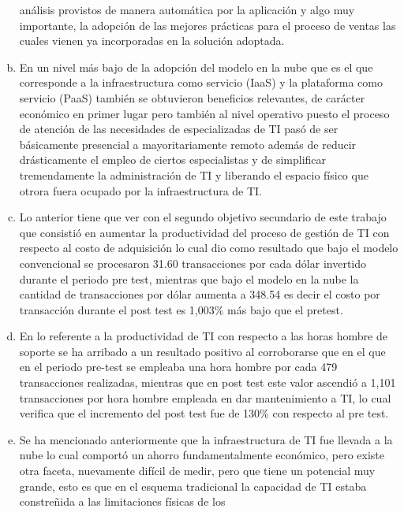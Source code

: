 \begin{enumerate}[a.]
          análisis provistos de manera automática por la aplicación y algo
          muy importante, la adopción de las mejores prácticas para el proceso
          de ventas las cuales vienen ya incorporadas en la solución adoptada.
    \item En un nivel más bajo de la adopción del modelo en la nube que es
          el que corresponde a la infraestructura como servicio (IaaS) y la
          plataforma como servicio (PaaS) también se obtuvieron beneficios
          relevantes, de carácter económico en primer lugar pero también
          al nivel operativo puesto el proceso de atención de las necesidades
          de especializadas de TI pasó de ser básicamente presencial a
          mayoritariamente remoto además de reducir drásticamente el empleo
          de ciertos especialistas y de simplificar tremendamente la administración
          de TI y liberando el espacio físico que otrora fuera ocupado por la
          infraestructura de TI.
    \item Lo anterior tiene que ver con el segundo objetivo secundario de este
          trabajo que consistió en aumentar la productividad del proceso de
          gestión de TI con respecto al costo de adquisición lo cual dio como
          resultado que bajo el modelo convencional se procesaron 31.60 transacciones
          por cada dólar invertido durante el periodo pre test, mientras que
          bajo el modelo en la nube la cantidad de transacciones por dólar
          aumenta a 348.54 es decir el costo por transacción durante el post
          test es 1,003\% más bajo que el pretest.
    \item En lo referente a la productividad de TI con respecto a las horas
          hombre de soporte se ha arribado a un resultado positivo al corroborarse
          que en el que en el periodo pre-test se empleaba una hora hombre por
          cada 479 transacciones realizadas, mientras que en post test este valor
          ascendió a 1,101 transacciones por hora hombre empleada en dar
          mantenimiento a TI, lo cual verifica que el incremento del post test
          fue de 130\% con respecto al pre test.
    \item Se ha mencionado anteriormente que la infraestructura de TI fue llevada
          a la nube lo cual comportó un ahorro fundamentalmente económico,
          pero existe otra faceta, nuevamente difícil de medir, pero que tiene
          un potencial muy grande, esto es que en el esquema tradicional la
          capacidad de TI estaba constreñida a las limitaciones físicas de los

\end{enumerate}

